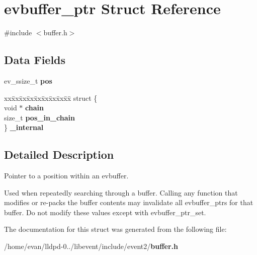 \section{evbuffer\-\_\-ptr \-Struct \-Reference}
\label{structevbuffer__ptr}


{\ttfamily \#include $<$buffer.\-h$>$}

\subsection*{\-Data \-Fields}
\begin{DoxyCompactItemize}
\item 
ev\-\_\-ssize\-\_\-t {\bfseries pos}\label{structevbuffer__ptr_aac82355f3e37dcd375107e33fe164de5}

\item 
\begin{tabbing}
xx\=xx\=xx\=xx\=xx\=xx\=xx\=xx\=xx\=\kill
struct \{\\
\>void $\ast$ {\bfseries chain}\\
\>size\_t {\bfseries pos\_in\_chain}\\
\} {\bfseries \_internal}\label{structevbuffer__ptr_aae777c09ec35d8549f1efce7cb83c450}
\\

\end{tabbing}\end{DoxyCompactItemize}


\subsection{\-Detailed \-Description}
\-Pointer to a position within an evbuffer.

\-Used when repeatedly searching through a buffer. \-Calling any function that modifies or re-\/packs the buffer contents may invalidate all evbuffer\-\_\-ptrs for that buffer. \-Do not modify these values except with evbuffer\-\_\-ptr\-\_\-set. 

\-The documentation for this struct was generated from the following file\-:\begin{DoxyCompactItemize}
\item 
/home/evan/lldpd-\/0../libevent/include/event2/{\bf buffer.\-h}\end{DoxyCompactItemize}
